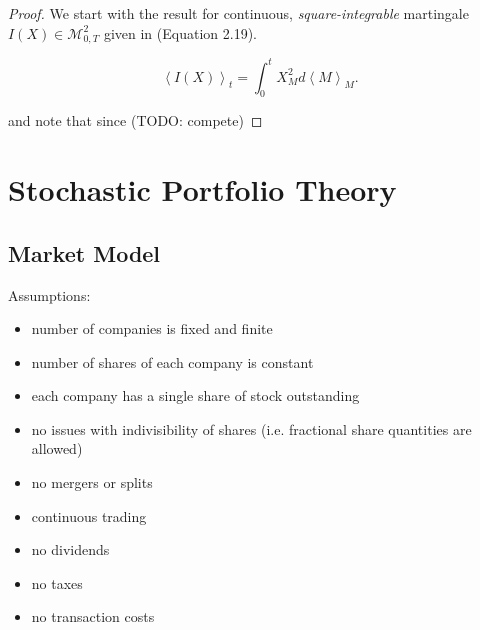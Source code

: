 \documentclass[british]{amsart}
\numberwithin{equation}{section}
\numberwithin{figure}{section}
\theoremstyle{plain}
\theoremstyle{definition}
\theoremstyle{plain}
\theoremstyle{plain}
\theoremstyle{plain}
\theoremstyle{remark}
\theoremstyle{plain}
\newcommand{\msquared}{\mathcal{M}^{2}_{0,T}}
\newcommand{\filtration}[1]{\mathcal{F_{#1}}}
\begin{document}
\begin{proof}
	We start with the result for continuous, \textit{square-integrable} martingale 
	$I(X) \in \msquared$ given in \cite{shreve2012} (Equation 2.19).

	\begin{equation*}
		\left<I(X)\right>_{t} = \int_{0}^{t} X_{M}^2 d\left<M\right>_{M}.
	\end{equation*}

	and note that since (TODO: compete)
\end{proof}


\newcommand{\abs}[1]{\mathop{|{#1}|}}
\newcommand{\market}{\mathcal{M}}
\newcommand{\rangei}{i=1,\dots,n}
\newcommand{\measure}{\mathbb{P}}
\newcommand{\probabilityspace}{(\Omega,\filtration,\measure)}

\section{Stochastic Portfolio Theory}


\subsection{Market Model}

Assumptions:
\begin{itemize}
	\item number of companies is fixed and finite
	\item number of shares of each company is constant
	\item each company has a single share of stock outstanding
	\item no issues with indivisibility of shares (i.e. fractional share 
				quantities are allowed)
	\item no mergers or splits
	\item continuous trading
	\item no dividends
	\item no taxes
	\item no transaction costs
\end{itemize}
\end{document}
